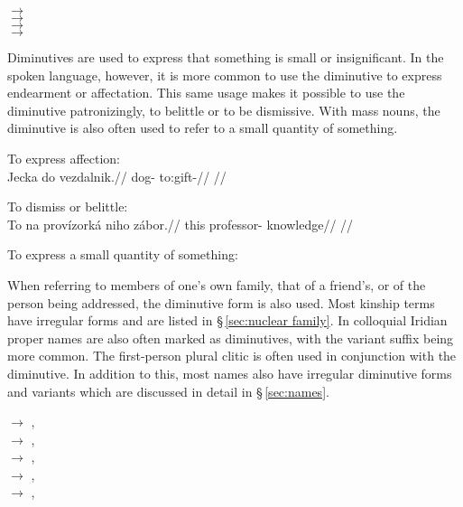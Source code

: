 \ex
{} $\rightarrow$ \\
 $\rightarrow$  \\
 $\rightarrow$  \\
 $\rightarrow$  
\xe

Diminutives are used to express that something is small or insignificant. In the spoken language, however, it is more common to use the diminutive to express endearment or affectation. This same usage makes it possible to use the diminutive patronizingly, to belittle or to be dismissive. With mass nouns, the diminutive is also often used to refer to a small quantity of something.

\pex
\a To express affection:\\
\begingl
\gla Jecka do vezdalnik.//
\glb dog-  to:gift-//
\glft {}//
\endgl

\a To dismiss or belittle:\\
\begingl
\gla To na prov\'izork\'a niho z\'abor.//
\glb this  professor-  knowledge//
\glft {}//
\endgl

\a To express a small quantity of something:
\xe

When referring to members of one's own family, that of a friend's, or of the person being addressed, the diminutive form is also used. Most kinship terms have irregular forms and are listed in \S\,\ref{sec:nuclear family}. In colloquial Iridian proper names are also often marked as diminutives, with the variant suffix  being more common. The first-person plural clitic  is often used in conjunction with the diminutive. In addition to this, most names also have irregular diminutive forms and variants which are discussed in detail in \S\,\ref{sec:names}.

\ex
{} $\rightarrow$ , \\
 $\rightarrow$ , \\
 $\rightarrow$ , \\
 $\rightarrow$ , \\
 $\rightarrow$ , 
\xe

